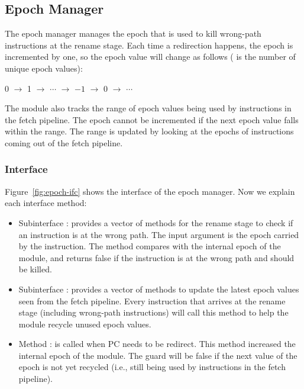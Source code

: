 \subsection{Epoch Manager}\label{sec:epoch}

The epoch manager manages the epoch that is used to kill wrong-path instructions at the rename stage.
Each time a redirection happens, the epoch is incremented by one, so the epoch value will change as follows ( is the number of unique epoch values):
\begin{center}
    0 $\rightarrow$ 1 $\rightarrow$ $\cdots$ $\rightarrow$ $-1$ $\rightarrow$ 0 $\rightarrow$ $\cdots$
\end{center}
The module also tracks the range of epoch values being used by instructions in the fetch pipeline.
The epoch cannot be incremented if the next epoch value falls within the range.
The range is updated by looking at the epochs of instructions coming out of the fetch pipeline.

\subsubsection{Interface}
Figure~\ref{fig:epoch-ifc} shows the interface of the epoch manager.
Now we explain each interface method:
\begin{itemize}
    \item Subinterface : provides a vector of methods for the rename stage to check if an instruction is at the wrong path.
    The input argument  is the epoch carried by the instruction.
    The method compares  with the internal epoch of the module, and returns false if the instruction is at the wrong path and should be killed.
    
    \item Subinterface : provides a vector of methods to update the latest epoch values seen from the fetch pipeline.
    Every instruction that arrives at the rename stage (including wrong-path instructions) will call this method to help the module recycle unused epoch values.
    
    \item Method : is called when PC needs to be redirect.
    This method increased the internal epoch of the module.
    The guard will be false if the next value of the epoch is not yet recycled (i.e., still being used by instructions in the fetch pipeline).
\end{itemize}

